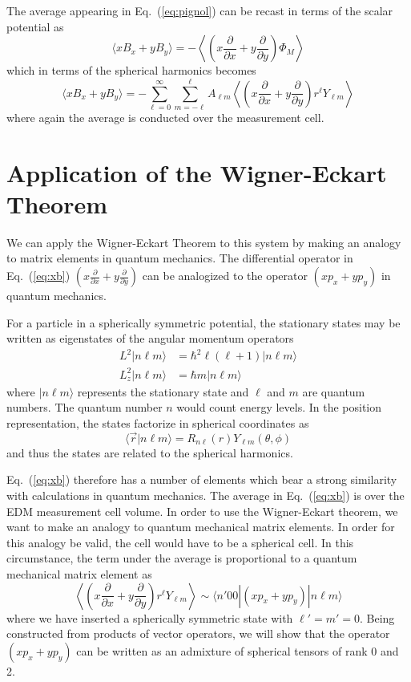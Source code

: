 \documentclass[preprint,12pt]{elsarticle}
\begin{document}
The average appearing in Eq.~(\ref{eq:pignol}) can be recast in terms
of the scalar potential as
\begin{equation}
  \langle xB_x+yB_y\rangle=-\left\langle\left(x\frac{\partial}{\partial
    x}+y\frac{\partial}{\partial y}\right)\Phi_M\right\rangle
\end{equation}
which in terms of the spherical harmonics becomes
\begin{equation}
  \label{eq:xb}
  \langle xB_x+yB_y\rangle=-\sum_{\ell=0}^\infty\sum_{m=-\ell}^\ell
  A_{\ell m}\left\langle\left(x\frac{\partial}{\partial
    x}+y\frac{\partial}{\partial y}\right)r^\ell Y_{\ell
    m}\right\rangle
\end{equation}
where again the average is conducted over the measurement cell.

\section{Application of the Wigner-Eckart Theorem}

We can apply the Wigner-Eckart Theorem to this system by making an
analogy to matrix elements in quantum mechanics.  The differential
operator in Eq.~(\ref{eq:xb}) $\left(x\frac{\partial}{\partial
  x}+y\frac{\partial}{\partial y}\right)$ can be analogized to the
operator $(xp_x+yp_y)$ in quantum mechanics.

For a particle in a spherically symmetric potential, the stationary
states may be written as eigenstates of the angular momentum operators
\begin{align}
L^2|n\ell m\rangle&=\hbar^2\ell(\ell+1)|n\ell m\rangle\\
L_z^2|n\ell m\rangle&=\hbar m|n\ell m\rangle
\end{align}
where $|n\ell m\rangle$ represents the stationary state and $\ell$ and
$m$ are quantum numbers.  The quantum number $n$ would count energy
levels.  In the position representation, the states factorize in
spherical coordinates as
\begin{equation}
\langle\vec{r}|n\ell m\rangle=R_{n\ell}(r)Y_{\ell m}(\theta,\phi)
\end{equation}
and thus the states are related to the spherical harmonics.

Eq.~(\ref{eq:xb}) therefore has a number of elements which bear a
strong similarity with calculations in quantum mechanics.  The average
in Eq.~(\ref{eq:xb}) is over the EDM measurement cell volume.  In
order to use the Wigner-Eckart theorem, we want to make an analogy to
quantum mechanical matrix elements.  In order for this analogy be
valid, the cell would have to be a spherical cell.  In this
circumstance, the term under the average is proportional to a quantum
mechanical matrix element as
\begin{equation}
\label{eq:matrix}
  \left\langle\left(x\frac{\partial}{\partial
  x}+y\frac{\partial}{\partial y}\right)r^\ell Y_{\ell
  m}\right\rangle\sim\langle n'00|(xp_x+yp_y)|n\ell m\rangle
\end{equation}
where we have inserted a spherically symmetric state with
$\ell'=m'=0$.  Being constructed from products of vector operators, we
will show that the operator $(xp_x+yp_y)$ can be written as an
admixture of spherical tensors of rank 0 and 2.
\end{document}
